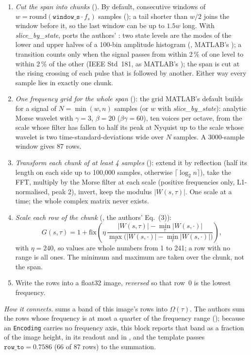 \begin{enumerate}
\item \emph{Cut the span into chunks} (). By default, consecutive windows of
  $w = \mathrm{round}(\texttt{window\_s}\cdot f_s)$ samples (); a tail
  shorter than $w/2$ joins the window before it, so the last window can be up to $1.5w$
  long. With \emph{slice\_by\_state},  ports the authors'
  : two state levels are the modes of the lower and upper halves of a
  100-bin amplitude histogram (, MATLAB's ); a
  transition counts only when the signal passes from within 2\,\% of one level to within
  2\,\% of the other (IEEE Std~181, as MATLAB's ); the span is cut at the
  rising crossing of each pulse that is followed by another. Either way every sample lies in
  exactly one chunk.
\item \emph{One frequency grid for the whole span} (): the grid MATLAB's
  default  builds for a signal of $N = \min(w, n)$ samples (or $w$ with
  \emph{slice\_by\_state}): analytic Morse wavelet with $\gamma = 3$, $\beta = 20$
  ($\beta\gamma = 60$), ten voices per octave, from the scale whose filter has fallen to half
  its peak at Nyquist up to the scale whose wavelet is two time-standard-deviations wide over
  $N$ samples. A 3000-sample window gives 87 rows.
\item \emph{Transform each chunk of at least 4 samples} (): extend it by
  reflection (half its length on each side up to 100{,}000 samples, otherwise
  $\lceil\log_2 n\rceil$), take the FFT, multiply by the Morse filter at each scale (positive
  frequencies only, L1-normalised, peak 2), invert, keep the modulus $|W(s,\tau)|$. One scale
  at a time; the whole complex matrix never exists.
\item \emph{Scale each row of the chunk} (, the authors' Eq.~(3)):
  \[ G(s,\tau) = 1 + \mathrm{fix}\!\left(\eta\,\frac{|W(s,\tau)| - \min_\tau |W(s,\cdot)|}
     {\max_\tau\bigl(|W(s,\cdot)| - \min_\tau |W(s,\cdot)|\bigr)}\right), \]
  with $\eta = 240$, so values are whole numbers from 1 to 241; a row with no range is all
  ones. The minimum and maximum are taken over the chunk, not the span.
\item Write the rows into a float32 image, \emph{reversed} so that row~0 is the lowest
  frequency.
\end{enumerate}

\emph{How it connects.}  sums a band of this image's
rows into $\Omega(\tau)$. The authors sum the rows whose frequency is at most a quarter of the
frequency range (); because an \texttt{Encoding} carries no frequency axis,
this block reports that band as a fraction of the image height, in its readout and in
, and the template passes $\texttt{row\_to} = 0.7586$
(66 of 87 rows) to the summation.

